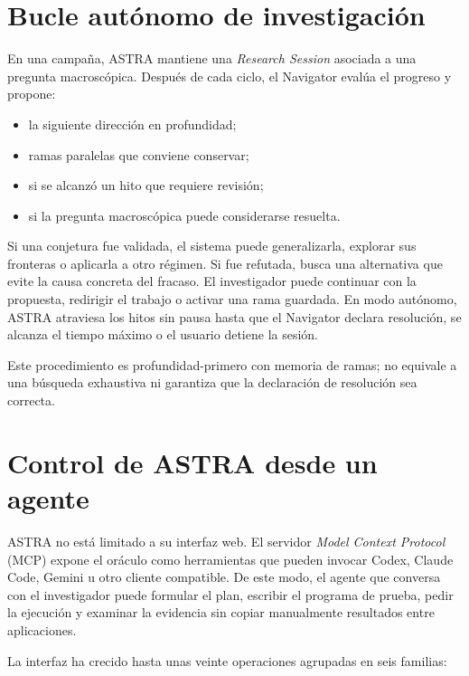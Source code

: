 \documentclass[11pt,a4paper]{article}
\begin{document}
\section{Bucle autónomo de investigación}

En una campaña, ASTRA mantiene una \textit{Research Session} asociada a una pregunta macroscópica. Después de cada ciclo, el Navigator evalúa el progreso y propone:

\begin{itemize}
  \item la siguiente dirección en profundidad;
  \item ramas paralelas que conviene conservar;
  \item si se alcanzó un hito que requiere revisión;
  \item si la pregunta macroscópica puede considerarse resuelta.
\end{itemize}

Si una conjetura fue validada, el sistema puede generalizarla, explorar sus fronteras o aplicarla a otro régimen. Si fue refutada, busca una alternativa que evite la causa concreta del fracaso. El investigador puede continuar con la propuesta, redirigir el trabajo o activar una rama guardada. En modo autónomo, ASTRA atraviesa los hitos sin pausa hasta que el Navigator declara resolución, se alcanza el tiempo máximo o el usuario detiene la sesión.

Este procedimiento es profundidad-primero con memoria de ramas; no equivale a una búsqueda exhaustiva ni garantiza que la declaración de resolución sea correcta.

\section{Control de ASTRA desde un agente}

ASTRA no está limitado a su interfaz web. El servidor \textit{Model Context Protocol} (MCP) expone el oráculo como herramientas que pueden invocar Codex, Claude Code, Gemini u otro cliente compatible. De este modo, el agente que conversa con el investigador puede formular el plan, escribir el programa de prueba, pedir la ejecución y examinar la evidencia sin copiar manualmente resultados entre aplicaciones.

La interfaz ha crecido hasta unas veinte operaciones agrupadas en seis familias:
\end{document}
